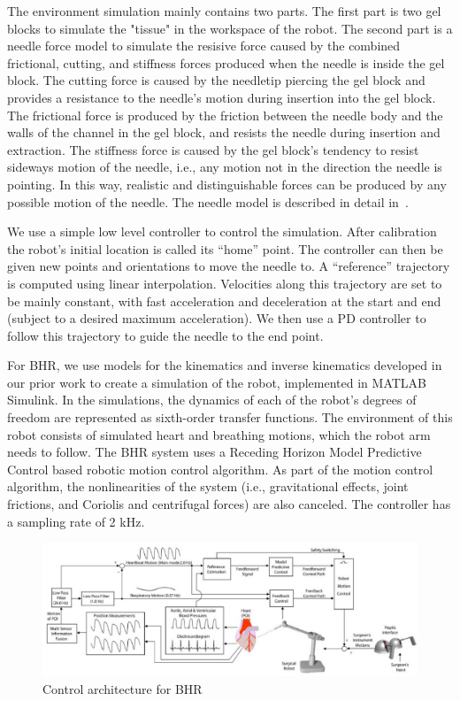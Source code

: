The environment simulation mainly contains two parts. The first part is two gel blocks to simulate the "tissue" in the workspace of the robot.  The second part is a needle force model to simulate the resisive force caused by the combined frictional, cutting, and stiffness forces produced when the needle is inside the gel block. The cutting force is caused by the needletip piercing the gel block and provides a resistance to the needle's motion during insertion into the gel block.  The frictional force is produced by the friction between the needle body and the walls of the channel in the gel block, and resists the needle during insertion and extraction. The stiffness force is caused by the gel block's tendency to resist sideways motion of the needle, i.e., any motion not in the direction the needle is pointing. In this way, realistic and distinguishable forces can be produced by any possible motion of the needle. The needle model is described in detail in~\cite{Russell2012}.

We use a simple low level controller to control the simulation. After calibration the robot's initial location is called its ``home'' point. The controller can then be given new points and orientations to move the needle to. A ``reference'' trajectory is computed using linear interpolation. Velocities along this trajectory are set to be mainly constant, with fast acceleration and deceleration at the start and end (subject to a desired maximum acceleration). We then use a PD controller to follow this trajectory to guide the needle to the end point.

For BHR, we use models for the kinematics and inverse kinematics developed in our prior work \cite{Bebek2007} to create a simulation of the robot, implemented in MATLAB Simulink. In the simulations, the dynamics of each of the robot’s degrees of freedom are represented as sixth-order transfer functions. The environment of this robot consists of simulated heart and breathing motions, which the robot arm needs to follow. The BHR system uses a Receding Horizon Model Predictive Control based robotic motion control algorithm. As part of the motion control algorithm, the nonlinearities of the system (i.e., gravitational effects, joint frictions, and Coriolis and centrifugal forces) are also canceled. The controller has a sampling rate of 2 kHz.

\begin{figure}[!thpb]
\centering
\includegraphics[width=\textwidth]{chapter5_BHR_control.pdf}
\caption{Control architecture for BHR}
\label{bhrcontrol}
\end{figure}

